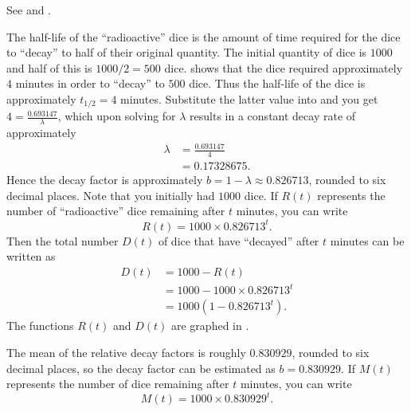 \documentclass[a4paper,oneside,12pt]{article}
\begin{document}
\begin{problem}
{\begin{solution}
See  and
.

\begin{table}[!htbp]
\centering

\caption{%
  This is the same as , but with the
  addition of columns for the cumulative sum of dice that have
  ``decayed''.
}
\label{tab:radioactive_dice_cumulative_decayed}
\end{table}

The half-life of the ``radioactive'' dice is the amount of time
required for the dice to ``decay'' to half of their original quantity.
The initial quantity of dice is $1000$ and half of this is
$1000 / 2 = 500$ dice.   shows that the
dice required approximately $4$ minutes in order to ``decay'' to $500$
dice.  Thus the half-life of the dice is approximately $t_{1/2} = 4$
minutes.  Substitute the latter value into
 and you get
$4 = \frac{0.693147}{\lambda}$, which upon solving for $\lambda$
results in a constant decay rate of approximately
\begin{align*}
\lambda
&=
\frac{0.693147}{4} \\[4pt]
&=
0.17328675.
\end{align*}
Hence the decay factor is approximately
$b = 1 - \lambda \approx 0.826713$, rounded to six decimal places.
Note that you initially had $1000$ dice.  If $R(t)$ represents the
number of ``radioactive'' dice remaining after $t$ minutes, you can
write
\begin{equation}
\label{eqn:radioactive_dice_decay_constant_formula}
R(t)
=
1000 \times 0.826713^t.
\end{equation}
Then the total number $D(t)$ of dice that have ``decayed'' after $t$
minutes can be written as
\begin{equation}
\label{eqn:radioactive_dice_total_decayed}
\begin{aligned}
D(t)
&=
1000 - R(t) \\[4pt]
&=
1000 - 1000 \times 0.826713^t \\[4pt]
&=
1000(1 - 0.826713^t).
\end{aligned}
\end{equation}
The functions $R(t)$ and $D(t)$ are graphed in
.

The mean of the relative decay factors is roughly $0.830929$, rounded
to six decimal places, so the decay factor can be estimated as
$b = 0.830929$.  If $M(t)$ represents the number of dice remaining
after $t$ minutes, you can write
\begin{equation}
\label{eqn:radioactive_dice_mean_decay_rate}
M(t)
=
1000 \times 0.830929^t.
\end{equation}


\end{solution}}
\end{problem}
\end{document}
